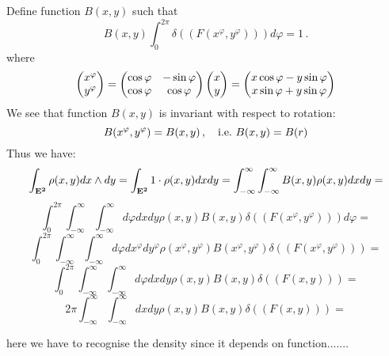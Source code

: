 \documentclass[12pt]{article}
\theoremstyle{theorem}
\numberwithin{equation}{section}
\begin{document}
             Define function $B(x,y)$ such that
                     \begin{equation*}
         B(x,y)
         \int_0^{2\pi}
  \delta \left(\left(F(x^\varphi,y^\varphi)\right)\right)d\varphi=1\,.
                     \end{equation*}
 where
               $$
 \begin{pmatrix}
         x^\varphi\cr
         y^\varphi\cr
 \end{pmatrix}
         =
 \begin{pmatrix}
         \cos\varphi &-\sin\varphi\cr
         \cos\varphi &\cos\varphi\cr
 \end{pmatrix}
 \begin{pmatrix}
         x\cr
         y\cr
 \end{pmatrix}
       =
 \begin{pmatrix}
     x\cos\varphi-y\sin\varphi\cr
     x\sin\varphi+y\sin\varphi\cr
 \end{pmatrix}
               $$
We see that function $B(x,y)$ is invariant with respect to rotation:
          \begin{equation*}
          B(x^\varphi,y^\varphi)=B(x,y)\,,\quad {\rm i.e.}\,\,
      B(x,y)=B(r)
          \end{equation*}
Thus we have:
              $$
\int_{\bf E^2} \rho(x,y)dx\wedge dy=
\int_{\bf E^2} 1\cdot  \rho(x,y)dx dy=
\int_{-\infty}^{\infty}
\int_{-\infty}^\infty 
B(x,y) \rho(x,y)dx dy=
                 $$
                 $$
         \int_0^{2\pi}
\int_{-\infty}^{\infty}
\int_{-\infty}^\infty d\varphi dx dy
       \rho(x,y)
             B(x,y) 
  \delta \left(\left(F(x^\varphi,y^\varphi)\right)\right)d\varphi=
              $$ $$
         \int_0^{2\pi}
\int_{-\infty}^{\infty}
\int_{-\infty}^\infty d\varphi dx^\varphi dy^\varphi
       \rho(x^\varphi,y^\varphi)
             B(x^\varphi,y^\varphi) 
  \delta \left(\left(F(x^\varphi,y^\varphi)\right)\right)=
              $$
              $$
         \int_0^{2\pi}
\int_{-\infty}^{\infty}
\int_{-\infty}^\infty d\varphi dx dy
       \rho(x,y)
             B(x,y) 
  \delta \left(\left(F(x,y)\right)\right)=
              $$
               $$
         2\pi
\int_{-\infty}^{\infty}
\int_{-\infty}^\infty  dx dy
       \rho(x,y)
             B(x,y) 
  \delta \left(\left(F(x,y)\right)\right)=
              $$


  here we have to recognise the density since
it depends on function.......
\end{document}
